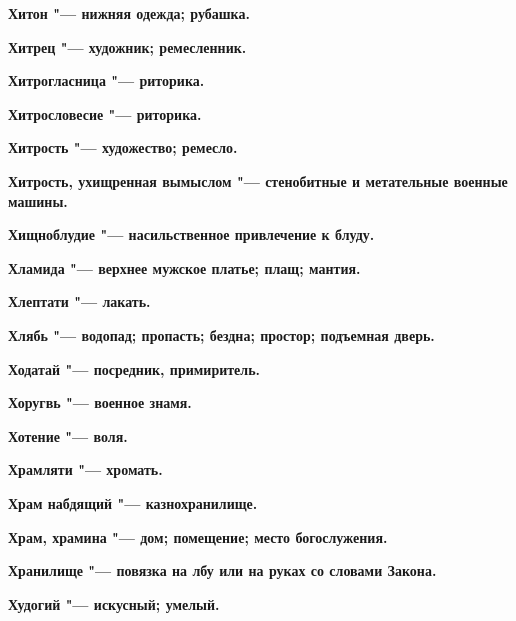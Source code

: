 \begin{multicols}{2}
\bfseries Хитон\normalfont{} "--- нижняя одежда; рубашка. 




\bfseries Хитрец\normalfont{} "--- художник; ремесленник. 




\bfseries Хитрогласница\normalfont{} "--- риторика. 




\bfseries Хитрословесие\normalfont{} "--- риторика. 




\bfseries Хитрость\normalfont{} "--- художество; ремесло. 




\bfseries Хитрость, ухищренная вымыслом\normalfont{} "--- стенобитные и метательные военные машины. 




\bfseries Хищноблудие\normalfont{} "--- насильственное привлечение к блуду. 




\bfseries Хламида\normalfont{} "--- верхнее мужское платье; плащ; мантия. 




\bfseries Хлептати\normalfont{} "--- лакать. 




\bfseries Хлябь\normalfont{} "--- водопад; пропасть; бездна; простор; подъемная дверь. 




\bfseries Ходатай\normalfont{} "--- посредник, примиритель. 




\bfseries Хоругвь\normalfont{} "--- военное знамя. 




\bfseries Хотение\normalfont{} "--- воля. 




\bfseries Храмляти\normalfont{} "--- хромать. 




\bfseries Храм набдящий\normalfont{} "--- казнохранилище. 




\bfseries Храм, храмина\normalfont{} "--- дом; помещение; место богослужения. 




\bfseries Хранилище\normalfont{} "--- повязка на лбу или на руках со словами Закона. 




\bfseries Худогий\normalfont{} "--- искусный; умелый. 





\end{multicols}
